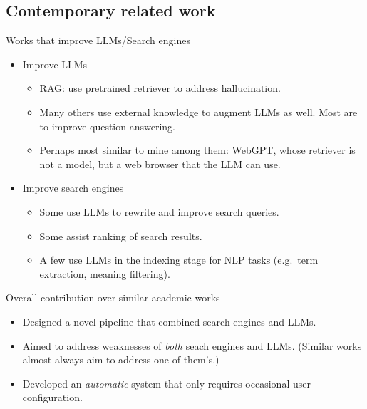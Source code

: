 \documentclass{beamer}
\begin{document}
\subsection{Contemporary related work}
\begin{frame}{Works that improve LLMs/Search engines}
	\begin{itemize}
	\item Improve LLMs
	\begin{itemize}
		\item RAG: use pretrained retriever to address hallucination.
		\item Many others use external knowledge to augment LLMs as well. Most
			are to improve question answering.
		\item Perhaps most similar to mine among them: WebGPT, whose retriever
			is not a model, but a web browser that the LLM can use.
	\end{itemize}
	\item Improve search engines
	\begin{itemize}
		\item Some use LLMs to rewrite and improve search queries.
		\item Some assist ranking of search results.
		\item A few use LLMs in the indexing stage for NLP tasks (e.g.\ term
			extraction, meaning filtering).
	\end{itemize}
	\end{itemize}
\end{frame}

\begin{frame}{Overall contribution over similar academic works}
	\begin{itemize}
		\item Designed a novel pipeline that combined search engines and LLMs.
		\item Aimed to address weaknesses of \emph{both} seach engines and
			LLMs. (Similar works almost always aim to address one of them's.)
		\item Developed an \emph{automatic} system that only requires
			occasional user configuration.
	\end{itemize}
\end{frame}
\end{document}
